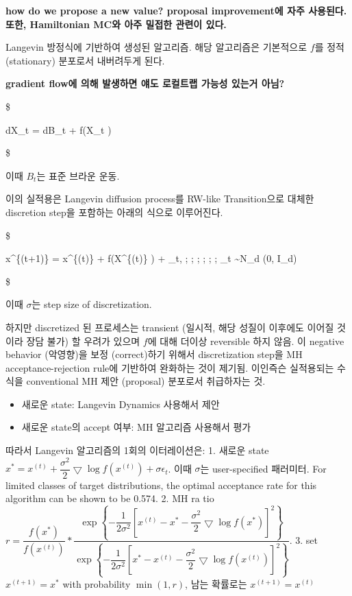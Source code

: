 \documentclass[
]{book}
\providecommand{\tightlist}{%
  \setlength{\itemsep}{0pt}\setlength{\parskip}{0pt}}
\begin{document}
\textbf{how do we propose a new value? proposal improvement에 자주 사용된다. 또한, Hamiltonian MC와 아주 밀접한 관련이 있다.}

Langevin 방정식에 기반하여 생성된 알고리즘. 해당 알고리즘은 기본적으로 \(f\)를 정적 (stationary) 분포로서 내버려두게 된다.

\textbf{gradient flow에 의해 발생하면 얘도 로컬트랩 가능성 있는거 아님?}

\$

dX\_t = dB\_t +  \bigtriangledown    \log f(X\_t )

\$

이때 \(B_t\)는 표준 브라운 운동.

이의 실적용은 Langevin diffusion process를 RW-like Transition으로 대체한 discretion step을 포함하는 아래의 식으로 이루어진다.

\$

x\^{}\{(t+1)\} = x\^{}\{(t)\} +  \bigtriangledown \log f(X\^{}\{(t)\} ) + \sigma \epsilon\_t, ; ; ; ; ; ; \epsilon\_t \sim N\_d (0, I\_d)

\$

이때 \(\sigma\)는 step size of discretization.

하지만 discretized 된 프로세스는 transient (일시적, 해당 성질이 이후에도 이어질 것이라 장담 불가) 할 우려가 있으며 \(f\)에 대해 더이상 reversible 하지 않음. 이 negative behavior (악영향)을 보정 (correct)하기 위해서 discretization step을 MH acceptance-rejection rule에 기반하여 완화하는 것이 제기됨. 이인즉슨 실적용되는 수식을 conventional MH 제안 (proposal) 분포로서 취급하자는 것.

\begin{itemize}
\tightlist
\item
  새로운 state: Langevin Dynamics 사용해서 제안
\item
  새로운 state의 accept 여부: MH 알고리즘 사용해서 평가
\end{itemize}

따라서 Langevin 알고리즘의 1회의 이터레이션은:
1. 새로운 state \(x^\ast = x^{(t)} + \dfrac {\sigma^2} {2} \bigtriangledown \log f(x^{(t)}) + \sigma \epsilon_t\). 이때 \(\sigma\)는 user-specified 패러미터. For limited classes of target distributions, the optimal acceptance rate for this algorithm can be shown to be 0.574.
2. MH ra tio \(r = \dfrac {f(x^\ast)}{f(x^{(t)})} \ast \dfrac {\exp \left\{ - \dfrac {1} {2\sigma^2} \left[ x^{(t)} - x^\ast - \dfrac {\sigma^2} {2} \bigtriangledown \log f(x^\ast) \right]^2 \right\}}{\exp \left\{ - \dfrac {1} {2\sigma^2} \left[ x^{\ast} - x^{(t)} - \dfrac {\sigma^2} {2} \bigtriangledown \log f(x^{(t)}) \right]^2 \right\}}\).
3. set \(x^{(t+1)} = x^\ast\) with probability \(\min (1, r)\), 남는 확률로는 \(x^{(t+1)} = x^{(t)}\)
\end{document}
